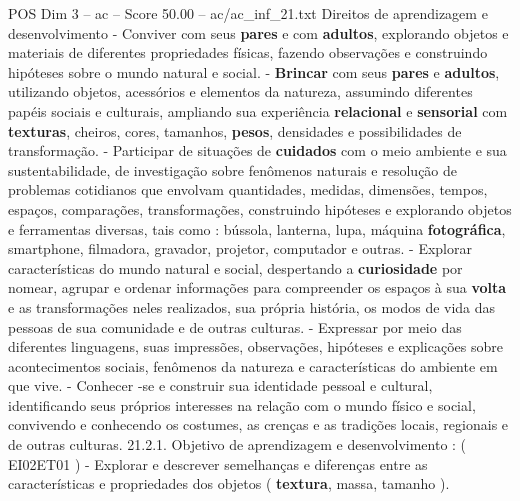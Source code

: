 \begin{textsample}{POS Dim 3 – ac – Score 50.00 – ac/ac\_inf\_21.txt}
Direitos de aprendizagem e desenvolvimento - Conviver com seus \textbf{pares} e com \textbf{adultos}, explorando objetos e materiais de diferentes propriedades físicas, fazendo observações e construindo hipóteses sobre o mundo natural e social. - \textbf{Brincar} com seus \textbf{pares} e \textbf{adultos}, utilizando objetos, acessórios e elementos da natureza, assumindo diferentes papéis sociais e culturais, ampliando sua experiência \textbf{relacional} e \textbf{sensorial} com \textbf{texturas}, cheiros, cores, tamanhos, \textbf{pesos}, densidades e possibilidades de transformação. - Participar de situações de \textbf{cuidados} com o meio ambiente e sua sustentabilidade, de investigação sobre fenômenos naturais e resolução de problemas cotidianos que envolvam quantidades, medidas, dimensões, tempos, espaços, comparações, transformações, construindo hipóteses e explorando objetos e ferramentas diversas, tais como : bússola, lanterna, lupa, máquina \textbf{fotográfica}, smartphone, filmadora, gravador, projetor, computador e outras. - Explorar características do mundo natural e social, despertando a \textbf{curiosidade} por nomear, agrupar e ordenar informações para compreender os espaços à sua \textbf{volta} e as transformações neles realizados, sua própria história, os modos de vida das pessoas de sua comunidade e de outras culturas. - Expressar por meio das diferentes linguagens, suas impressões, observações, hipóteses e explicações sobre acontecimentos sociais, fenômenos da natureza e características do ambiente em que vive. - Conhecer -se e construir sua identidade pessoal e cultural, identificando seus próprios interesses na relação com o mundo físico e social, convivendo e conhecendo os costumes, as crenças e as tradições locais, regionais e de outras culturas. 21.2.1.
Objetivo de aprendizagem e desenvolvimento : ( EI02ET01 ) - Explorar e descrever semelhanças e diferenças entre as características e propriedades dos objetos ( \textbf{textura}, massa, tamanho ).

\end{textsample}
